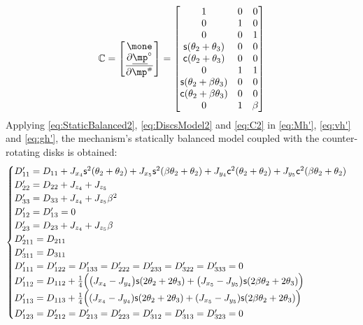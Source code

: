 \documentclass[a4paper,11pt,brazil,fleqn]{article}
\begin{document}
\begin{equation}\label{eq:C2}
\mC =
\begin{bmatrix}
\mone \\
\displaystyle\frac{\partial \underline{\mp}^\circ}{\partial \mp\ssh}
\end{bmatrix}  =
\begin{bmatrix}
1 & 0 & 0 \\
0 & 1 & 0 \\
0 & 0 & 1 \\
\ssin(\theta_2+\theta_3) & 0 & 0 \\
\ccos(\theta_2+\theta_3) & 0 & 0 \\
0 & 1 & 1 \\
\ssin(\theta_2+\beta\theta_3) & 0 & 0 \\
\ccos(\theta_2+\beta\theta_3) & 0 & 0 \\
0 & 1 & \beta \\
\end{bmatrix} 
\end{equation}
Applying \eqref{eq:StaticBalanced2}, \eqref{eq:DiscsModel2} and \eqref{eq:C2} in \eqref{eq:Mh'}, \eqref{eq:vh'} and \eqref{eq:gh'}, the mechanism's statically balanced model coupled with the counter-rotating disks is obtained:
\begin{equation}\label{eq:CoupledDynamics2}
\begin{cases}
D'_{11} = D_{11} + J_{x_4}\mathsf{s}^2(\theta_2+\theta_2) + J_{x_5}\mathsf{s}^2(\beta\theta_2+\theta_2) + J_{y_4}\mathsf{c}^2(\theta_2+\theta_2) + J_{y_5}\mathsf{c}^2(\beta\theta_2+\theta_2) \\
D'_{22} = D_{22} + J_{z_4} + J_{z_5} \\
D'_{33} = D_{33} + J_{z_4} + J_{z_5} \beta^2\\
D'_{12} = D'_{13} = 0\\
D'_{23} = D_{23} + J_{z_4} + J_{z_5} \beta \\
D'_{211} = D_{211} \\
D'_{311} = D_{311} \\
D'_{111} = D'_{122} = D'_{133} = D'_{222} = D'_{233} = D'_{322} = D'_{333} = 0 \\
D'_{112} = D_{112} +  \frac{1}{4} \Big( \big(J_{x_4} - J_{y_4}\big)\mathsf{s}(2\theta_2+2\theta_3) + \big(J_{x_5} - J_{y_5}\big)\mathsf{s}(2\beta\theta_2+2\theta_3) \Big) \\
D'_{113} =  D_{113} + \frac{1}{4} \Big( (J_{x_4} - J_{y_4})\mathsf{s}(2\theta_2+2\theta_3) + (J_{x_5} - J_{y_5})\mathsf{s}(2\beta\theta_2+2\theta_3) \Big) \\
D'_{123} = D'_{212} = D'_{213} = D'_{223} = D'_{312} = D'_{313} = D'_{323} = 0 \\
\end{cases}
\end{equation}
\end{document}
